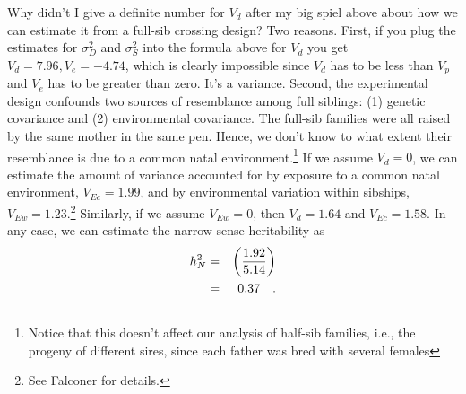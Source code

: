 Why didn't I give a definite number for $V_d$ after my big spiel above
about how we can estimate it from a full-sib crossing design?  Two
reasons.  First, if you plug the estimates for $\sigma^2_D$ and
$\sigma^2_S$ into the formula above for $V_d$ you get $V_d = 7.96, V_e
= -4.74$, which is clearly impossible since $V_d$ has to be less than
$V_p$ and $V_e$ has to be greater than zero. It's a variance.  Second,
the experimental design confounds two sources of resemblance among
full siblings: (1) genetic covariance and (2) environmental
covariance.  The full-sib families were all raised by the same mother
in the same pen. Hence, we don't know to what extent their resemblance
is due to a common natal environment.\footnote{Notice that this
  doesn't affect our analysis of half-sib families, i.e., the progeny
  of different sires, since each father was bred with several females}
If we assume $V_d = 0$, we can estimate the amount of variance
accounted for by exposure to a common natal environment, $V_{Ec} =
1.99$, and by environmental variation within sibships, $V_{Ew} =
1.23$.\footnote{See Falconer for details.}  Similarly, if we assume
$V_{Ew} = 0$, then $V_d = 1.64$ and $V_{Ec} = 1.58$.  In any case, we
can estimate the narrow sense heritability as
\begin{eqnarray*}
h^2_N &=& \left({1.92 \over 5.14}\right) \\
      &=& 0.37 \quad .
\end{eqnarray*}

